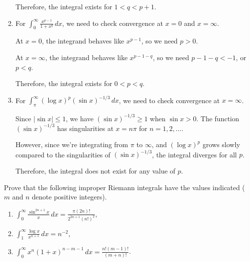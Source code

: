 \begin{enumerate}[label=(\alph*)]
    Therefore, the integral exists for $1 < q < p + 1$.
    
    \item For $\int_{0}^{\infty} \frac{x^{p-1}}{1 + x^q} \, dx$, we need to check convergence at $x = 0$ and $x = \infty$.
    
    At $x = 0$, the integrand behaves like $x^{p-1}$, so we need $p > 0$.
    
    At $x = \infty$, the integrand behaves like $x^{p-1-q}$, so we need $p - 1 - q < -1$, or $p < q$.
    
    Therefore, the integral exists for $0 < p < q$.
    
    \item For $\int_{\pi}^{\infty} (\log x)^p (\sin x)^{-1/3} \, dx$, we need to check convergence at $x = \infty$.
    
    Since $|\sin x| \leq 1$, we have $(\sin x)^{-1/3} \geq 1$ when $\sin x > 0$. The function $(\sin x)^{-1/3}$ has singularities at $x = n\pi$ for $n = 1, 2, \ldots$.
    
    However, since we're integrating from $\pi$ to $\infty$, and $(\log x)^p$ grows slowly compared to the singularities of $(\sin x)^{-1/3}$, the integral diverges for all $p$.
    
    Therefore, the integral does not exist for any value of $p$.
\end{enumerate}

\begin{problembox}
Prove that the following improper Riemann integrals have the values indicated ($m$ and $n$ denote positive integers).
\begin{enumerate}[label=(\alph*)]
    \item $\int_{0}^{\infty} \frac{\sin^{2n+1} x}{x} \, dx = \frac{\pi(2n)!}{2^{2n+1}(n!)^2}$,
    \item $\int_{1}^{\infty} \frac{\log x}{x^{n+1}} \, dx = n^{-2}$,
    \item $\int_{0}^{\infty} x^n (1 + x)^{n-m-1} \, dx = \frac{n!(m-1)!}{(m+n)!}$.
\end{enumerate}
\end{problembox}

